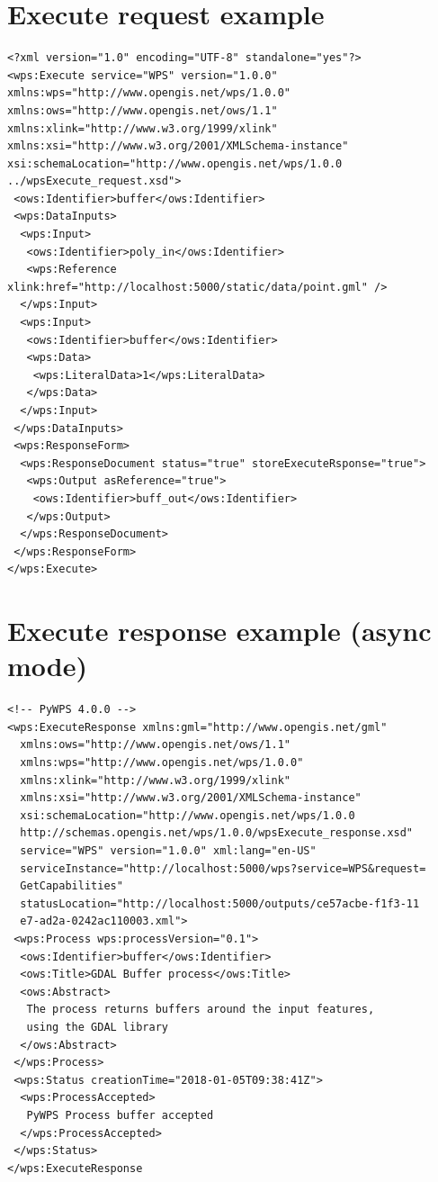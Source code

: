 \documentclass[12pt,a4paper]{article}
\begin{document}
\section{Execute request example}
\label{app:ExecuteRequest}
\begin{lstlisting}[basicstyle=\small,caption={Execute request example}]
<?xml version="1.0" encoding="UTF-8" standalone="yes"?>
<wps:Execute service="WPS" version="1.0.0" xmlns:wps="http://www.opengis.net/wps/1.0.0" xmlns:ows="http://www.opengis.net/ows/1.1" xmlns:xlink="http://www.w3.org/1999/xlink" xmlns:xsi="http://www.w3.org/2001/XMLSchema-instance" xsi:schemaLocation="http://www.opengis.net/wps/1.0.0 ../wpsExecute_request.xsd">
 <ows:Identifier>buffer</ows:Identifier>
 <wps:DataInputs>
  <wps:Input>
   <ows:Identifier>poly_in</ows:Identifier>
   <wps:Reference xlink:href="http://localhost:5000/static/data/point.gml" />
  </wps:Input>
  <wps:Input>
   <ows:Identifier>buffer</ows:Identifier>
   <wps:Data>
    <wps:LiteralData>1</wps:LiteralData>
   </wps:Data>
  </wps:Input>
 </wps:DataInputs>
 <wps:ResponseForm>
  <wps:ResponseDocument status="true" storeExecuteRsponse="true">
   <wps:Output asReference="true">
    <ows:Identifier>buff_out</ows:Identifier>
   </wps:Output>
  </wps:ResponseDocument>
 </wps:ResponseForm>
</wps:Execute>
\end{lstlisting}

\newpage
\section{Execute response example (async mode)}
\label{app:ExecuteResponse}
\begin{lstlisting}[basicstyle=\small,caption={Execute response example (async mode)}]
<!-- PyWPS 4.0.0 -->
<wps:ExecuteResponse xmlns:gml="http://www.opengis.net/gml" 
  xmlns:ows="http://www.opengis.net/ows/1.1" 
  xmlns:wps="http://www.opengis.net/wps/1.0.0" 
  xmlns:xlink="http://www.w3.org/1999/xlink" 
  xmlns:xsi="http://www.w3.org/2001/XMLSchema-instance" 
  xsi:schemaLocation="http://www.opengis.net/wps/1.0.0 
  http://schemas.opengis.net/wps/1.0.0/wpsExecute_response.xsd" 
  service="WPS" version="1.0.0" xml:lang="en-US" 
  serviceInstance="http://localhost:5000/wps?service=WPS&request=
  GetCapabilities" 
  statusLocation="http://localhost:5000/outputs/ce57acbe-f1f3-11
  e7-ad2a-0242ac110003.xml">
 <wps:Process wps:processVersion="0.1">
  <ows:Identifier>buffer</ows:Identifier>
  <ows:Title>GDAL Buffer process</ows:Title>
  <ows:Abstract>
   The process returns buffers around the input features,
   using the GDAL library
  </ows:Abstract>
 </wps:Process>
 <wps:Status creationTime="2018-01-05T09:38:41Z">
  <wps:ProcessAccepted>
   PyWPS Process buffer accepted
  </wps:ProcessAccepted>
 </wps:Status>
</wps:ExecuteResponse
\end{lstlisting}
\end{document}
